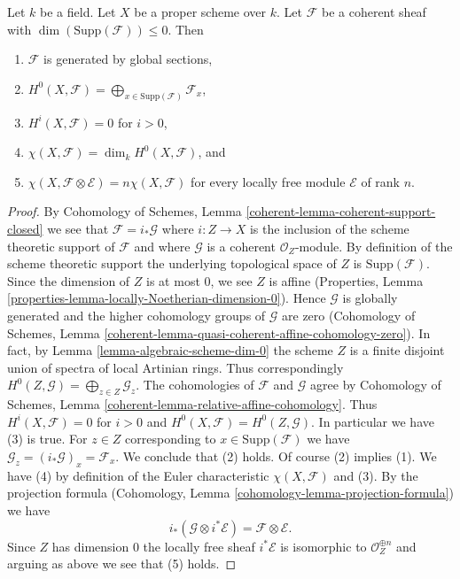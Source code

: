 \begin{lemma}
\label{lemma-chi-tensor-finite}
Let $k$ be a field. Let $X$ be a proper scheme over $k$. Let $\mathcal{F}$
be a coherent sheaf with $\dim(\text{Supp}(\mathcal{F})) \leq 0$.
Then
\begin{enumerate}
\item $\mathcal{F}$ is generated by global sections,
\item $H^0(X, \mathcal{F}) =
\bigoplus_{x \in \text{Supp}(\mathcal{F})} \mathcal{F}_x$,
\item $H^i(X, \mathcal{F}) = 0$ for $i > 0$,
\item $\chi(X, \mathcal{F}) = \dim_k H^0(X, \mathcal{F})$, and
\item
$\chi(X, \mathcal{F} \otimes \mathcal{E}) = n\chi(X, \mathcal{F})$
for every locally free module $\mathcal{E}$ of rank $n$.
\end{enumerate}
\end{lemma}

\begin{proof}
By Cohomology of Schemes, Lemma \ref{coherent-lemma-coherent-support-closed}
we see that $\mathcal{F} = i_*\mathcal{G}$ where $i : Z \to X$ is the inclusion
of the scheme theoretic support of $\mathcal{F}$ and where $\mathcal{G}$
is a coherent $\mathcal{O}_Z$-module. By definition of the scheme theoretic
support the underlying topological space of $Z$ is $\text{Supp}(\mathcal{F})$.
Since the dimension of $Z$ is at most $0$, we see $Z$ is affine (Properties,
Lemma
\ref{properties-lemma-locally-Noetherian-dimension-0}).
Hence $\mathcal{G}$ is globally generated and the higher
cohomology groups of $\mathcal{G}$ are zero
(Cohomology of Schemes, Lemma
\ref{coherent-lemma-quasi-coherent-affine-cohomology-zero}).
In fact, by Lemma \ref{lemma-algebraic-scheme-dim-0}
the scheme $Z$ is a finite disjoint union of spectra
of local Artinian rings. Thus correspondingly
$H^0(Z, \mathcal{G}) = \bigoplus_{z \in Z} \mathcal{G}_z$.
The cohomologies of $\mathcal{F}$ and $\mathcal{G}$ agree by
Cohomology of Schemes, Lemma \ref{coherent-lemma-relative-affine-cohomology}.
Thus $H^i(X, \mathcal{F}) = 0$ for $i > 0$ and
$H^0(X, \mathcal{F}) = H^0(Z, \mathcal{G})$.
In particular we have (3) is true.
For $z \in Z$ corresponding to $x \in \text{Supp}(\mathcal{F})$
we have $\mathcal{G}_z = (i_*\mathcal{G})_x = \mathcal{F}_x$.
We conclude that (2) holds. Of course (2) implies (1).
We have (4) by definition of the Euler characteristic $\chi(X, \mathcal{F})$
and (3). By the projection formula
(Cohomology, Lemma \ref{cohomology-lemma-projection-formula}) we have
$$
i_*(\mathcal{G} \otimes i^*\mathcal{E}) = \mathcal{F} \otimes \mathcal{E}.
$$
Since $Z$ has dimension $0$ the locally free sheaf $i^*\mathcal{E}$
is isomorphic to $\mathcal{O}_Z^{\oplus n}$ and arguing as above
we see that (5) holds.
\end{proof}

